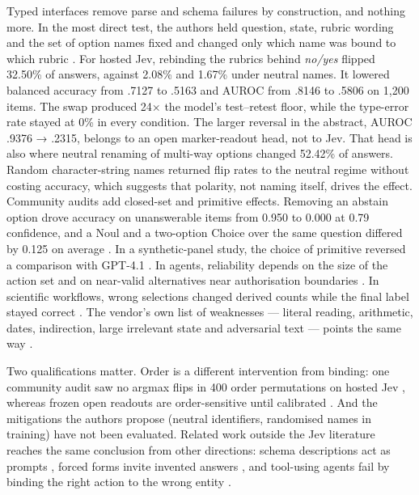 Typed interfaces remove parse and schema failures by construction, and nothing more. In the most direct test, the authors held question, state, rubric wording and the set of option names fixed and changed only which name was bound to which rubric \citep{arxiv2609_26758}. For hosted Jev, rebinding the rubrics behind \emph{no/yes} flipped 32.50\% of answers, against 2.08\% and 1.67\% under neutral names. It lowered balanced accuracy from .7127 to .5163 and AUROC from .8146 to .5806 on 1,200 items. The swap produced 24× the model's test–retest floor, while the type-error rate stayed at 0\% in every condition. The larger reversal in the abstract, AUROC .9376 → .2315, belongs to an open marker-readout head, not to Jev. That head is also where neutral renaming of multi-way options changed 52.42\% of answers. Random character-string names returned flip rates to the neutral regime without costing accuracy, which suggests that polarity, not naming itself, drives the effect. Community audits add closed-set and primitive effects. Removing an abstain option drove accuracy on unanswerable items from 0.950 to 0.000 at 0.79 confidence, and a Noul and a two-option Choice over the same question differed by 0.125 on average \citep{gh_jujumilk3_jev_calibration_audit}. In a synthetic-panel study, the choice of primitive reversed a comparison with GPT-4.1 \citep{gh_jjd_lab_jev_synthetic_survey}. In agents, reliability depends on the size of the action set and on near-valid alternatives near authorisation boundaries \citep{arxiv2609_26532}. In scientific workflows, wrong selections changed derived counts while the final label stayed correct \citep{arxiv2609_24965}. The vendor's own list of weaknesses — literal reading, arithmetic, dates, indirection, large irrelevant state and adversarial text — points the same way \citep{typesafe2026jaggedness}.

Two qualifications matter. Order is a different intervention from binding: one community audit saw no argmax flips in 400 order permutations on hosted Jev \citep{gh_jujumilk3_jev_calibration_audit}, whereas frozen open readouts are order-sensitive until calibrated \citep{gh_nokia_applied_research_anyjev}. And the mitigations the authors propose (neutral identifiers, randomised names in training) have not been evaluated. Related work outside the Jev literature reaches the same conclusion from other directions: schema descriptions act as prompts \citep{arxiv2608_08254}, forced forms invite invented answers \citep{arxiv2607_20492}, and tool-using agents fail by binding the right action to the wrong entity \citep{arxiv2606_30531}.

